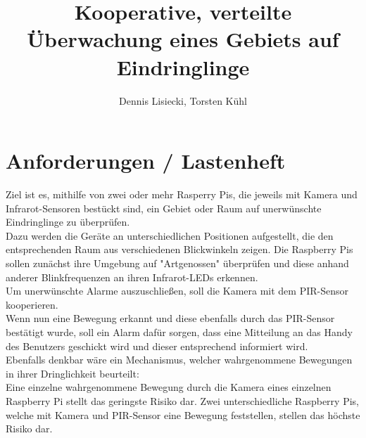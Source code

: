 \documentclass[9pt,a4paper]{IEEEtran}
\title{Kooperative, verteilte Überwachung eines Gebiets auf Eindringlinge}		%
\author{Dennis Lisiecki, Torsten Kühl}								%
\begin{document}

\maketitle	%

\section{Anforderungen / Lastenheft}
Ziel ist es, mithilfe von zwei oder mehr Rasperry Pis, die jeweils mit Kamera und Infrarot-Sensoren bestückt sind, ein Gebiet oder Raum auf unerwünschte Eindringlinge zu überprüfen.\\
Dazu werden die Geräte an unterschiedlichen Positionen aufgestellt, die den entsprechenden Raum aus verschiedenen Blickwinkeln zeigen. 
Die Raspberry Pis sollen zunächst ihre Umgebung auf "Artgenossen" überprüfen und diese anhand anderer Blinkfrequenzen an ihren Infrarot-LEDs erkennen. \\
Um unerwünschte Alarme auszuschließen, soll die Kamera mit dem PIR-Sensor kooperieren. \\
Wenn nun eine Bewegung erkannt und diese ebenfalls durch das PIR-Sensor bestätigt wurde, soll ein Alarm dafür sorgen, dass eine Mitteilung an das Handy des Benutzers geschickt wird und dieser entsprechend informiert wird.\\
Ebenfalls denkbar wäre ein Mechanismus, welcher wahrgenommene Bewegungen in ihrer Dringlichkeit beurteilt:\\
Eine einzelne wahrgenommene Bewegung durch die Kamera eines einzelnen Raspberry Pi stellt das geringste Risiko dar.
Zwei unterschiedliche Raspberry Pis, welche mit Kamera und PIR-Sensor eine Bewegung feststellen, stellen das höchste Risiko dar.
\end{document}
